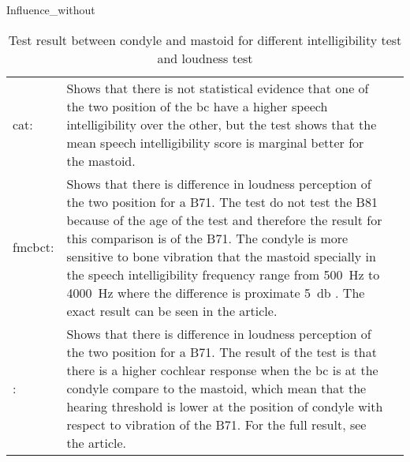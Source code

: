Influence_without
 
\begin{table}[H]
\begin{tabularx}{\textwidth}{l X l}
\hline
\gls{cat}: & Shows that there is not statistical evidence that one of the two position of the \gls{bc} have a higher speech intelligibility over the other, but the test shows that the mean speech intelligibility score is marginal better for the mastoid. \\
\gls{fmcbct}: & Shows that there is difference in loudness perception of the two position for a B71. The test do not test the B81 because of the age of the test and therefore the result for this comparison is of the B71. The condyle is more sensitive to bone vibration that the mastoid specially in the speech intelligibility frequency range from \SI{500}{\hertz} to \SI{4000}{\hertz} where the difference is proximate \SI{5}{\decibel} \citep{freefield_method}. The exact result can be seen in the article. \\
\citep{Influence_without}: & Shows that there is difference in loudness perception of the two position for a B71. The result of the test is that there is a higher cochlear response when the \gls{bc} is at the condyle compare to the mastoid, which mean that the hearing threshold is lower at the position of condyle \citep{Influence_without} with respect to vibration of the B71. For the full result, see the article. \\ \hline
\end{tabularx}
\caption{Test result between condyle and mastoid for different intelligibility test and loudness test} 
\label{tab:test_methoed}
\end{table}



